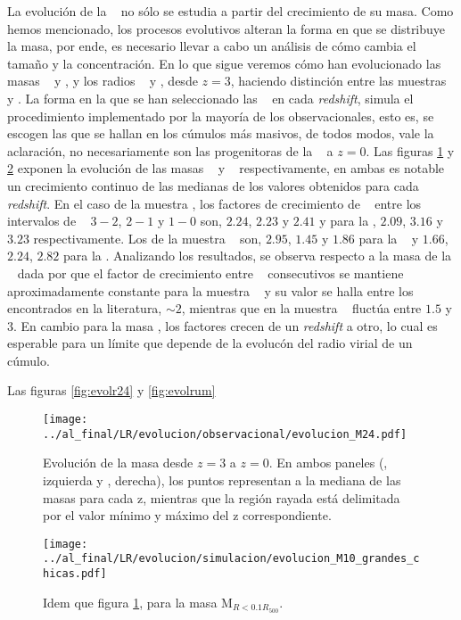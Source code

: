 La evoluci\'on de la \bcg~ no s\'olo se estudia a partir del crecimiento de su masa. Como
hemos mencionado, los procesos evolutivos alteran la forma en que se distribuye la masa, por ende, es necesario
llevar a cabo un an\'alisis de c\'omo cambia el tama\~no y la concentraci\'on.
En lo que sigue veremos c\'omo han evolucionado las masas
\mvc~ y \mdiez, y los radios \rvc~ y \rum, desde $z=3$, haciendo
distinci\'on entre las muestras
\cmay~ y \cmen.
La forma en la que se han seleccionado las \bcgs~ en cada \textit{redshift}, simula
el procedimiento implementado por la mayor\'ia de los observacionales,
esto es, se escogen las que se hallan en los c\'umulos m\'as masivos, de todos modos, vale la aclaraci\'on,
no necesariamente son las progenitoras de la \bcgs~ a $z=0$.
Las figuras \ref{fig:evolmbcg} y \ref{fig:evolm10} exponen la evoluci\'on de las masas \mvc~ y \mdiez~ respectivamente,
en ambas es notable un crecimiento continuo de las medianas de los valores
obtenidos para cada \textit{redshift}. En el caso de la muestra \cmay, los factores de crecimiento de \mvc~ entre
los intervalos de \z~ $3-2$, $2-1$ y $1-0$ son, $2.24$, $2.23$ y $2.41$ y para la \mdiez, $2.09$, $3.16$ y $3.23$ respectivamente.
Los de la muestra \cmen~ son, $2.95$, $1.45$ y $1.86$ para la \mvc~ y $1.66$, $2.24$, $2.82$ para la \mdiez.
Analizando los resultados, se observa respecto a la masa de la \bcg~ dada por \mvc que
el factor de crecimiento entre \z~ consecutivos se mantiene aproximadamente constante para la muestra \cmay~ y su valor 
se halla entre los encontrados en la literatura, $\sim2$, mientras que en la muestra \cmen~ fluct\'ua entre $1.5$ y $3$.
En cambio para la masa \mdiez,
los factores crecen de un \textit{redshift} a otro, lo cual es esperable para un l\'imite que depende de
la evoluc\'on del radio virial de un c\'umulo.

Las figuras \ref{fig:evolr24} y \ref{fig:evolrum} 

\begin{figure}[H]
 \centering
 \texttt{[image: ../al\_final/LR/evolucion/observacional/evolucion\_M24.pdf]}
\caption{Evoluci\'on de la masa \mvc desde $z=3$ a $z=0$. En ambos paneles (\cmay, izquierda y \cmen, derecha), los puntos representan
a la mediana de las masas para cada z, mientras
que la regi\'on rayada est\'a delimitada por el valor m\'inimo y m\'aximo del z correspondiente. 
}
\label{fig:evolmbcg}
\end{figure}

\begin{figure}[H]
 \centering
 \texttt{[image: ../al\_final/LR/evolucion/simulacion/evolucion\_M10\_grandes\_chicas.pdf]}
\caption{Idem que figura \ref{fig:evolmbcg}, para la masa M$_{R<0.1R_{500}}$.}
\label{fig:evolm10}
\end{figure}


